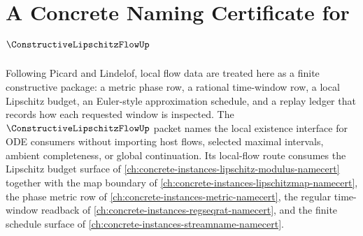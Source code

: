 \chapter{A Concrete Naming Certificate for $\ConstructiveLipschitzFlowUp$}
\label{ch:concrete-instances-constructive-lipschitz-flow-namecert}

Following Picard and Lindelof, local flow data are treated here as a finite
constructive package: a metric phase row, a rational time-window row, a local
Lipschitz budget, an Euler-style approximation schedule, and a replay ledger
that records how each requested window is inspected. The
$\ConstructiveLipschitzFlowUp$ packet names the local existence interface for
ODE consumers without importing host flows, selected maximal intervals,
ambient completeness, or global continuation. Its local-flow route consumes
the Lipschitz budget surface of
\autoref{ch:concrete-instances-lipschitz-modulus-namecert} together with the
map boundary of \autoref{ch:concrete-instances-lipschitzmap-namecert}, the
phase metric row of \autoref{ch:concrete-instances-metric-namecert}, the
regular time-window readback of
\autoref{ch:concrete-instances-regseqrat-namecert}, and the finite schedule
surface of \autoref{ch:concrete-instances-streamname-namecert}.

